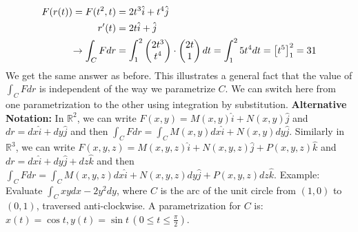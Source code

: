 \documentclass{article}
\newcommand{\nn}{\leavevmode \newline \newline} %
\newcommand{\R}{\mathbb{R}} %
\numberwithin{equation}{subsection} %
\begin{document}
\begin{equation}
    \begin{split}
        F(r(t)) = F(t^2,t) &= 2t^3\hat{i}+t^4\hat{j}
        \\
        r'(t) &= 2t\hat{i}+\hat{j}
        \\
        \to \int_C Fdr &= \mathlarger{\int}_1^2
        \begin{pmatrix}
            2t^3\\t^4
        \end{pmatrix}
        \cdot
        \begin{pmatrix}
            2t\\1
        \end{pmatrix}
        dt = 
        \int_1^2 5t^4 dt = \left[ t^5 \right]_1^2 = 31
    \end{split}
\end{equation}
We get the same answer as before. This illustrates a general fact that the value of $\int_C Fdr$ is independent of the way we parametrize $C$. We can switch here from one parametrization to the other using integration by substitution.
\nn
\textbf{Alternative Notation:} In $\R^2$, we can write $F(x,y)=M(x,y)\hat{i} + N(x,y)\hat{j}$ and $dr=dx\hat{i}+dy\hat{j}$ and then $\int_C Fdr = \int_C M(x,y)dx\hat{i}+N(x,y)dy\hat{j}$. Similarly in $\R^3$, we can write $F(x,y,z)=M(x,y,z)\hat{i}+N(x,y,z)\hat{j}+P(x,y,z)\hat{k}$ and $dr=dx\hat{i}+dy\hat{j}+dz\hat{k}$ and then $\int_C Fdr=\int_C M(x,y,z)dx\hat{i}+N(x,y,z)dy\hat{j}+P(x,y,z)dz\hat{k}$.
\nn
Example: Evaluate $\int_C xydx-2y^2dy$, where $C$ is the arc of the unit circle from $(1,0)$ to $(0,1)$, traversed anti-clockwise. A parametrization for $C$ is: $x(t)=\cos{t}, y(t)=\sin{t}\, (0 \leq t \leq \frac{\pi}{2})$.
\end{document}
